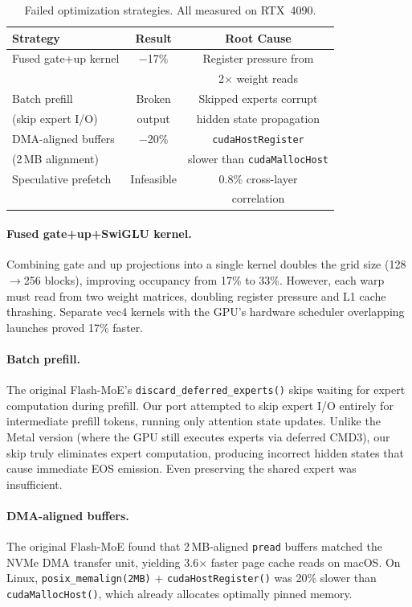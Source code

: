 \documentclass[11pt]{article}
\begin{document}
\begin{table}[h]
\centering
\small
\caption{Failed optimization strategies. All measured on RTX~4090.}
\label{tab:negative}
\begin{tabular}{lcc}
\toprule
\textbf{Strategy} & \textbf{Result} & \textbf{Root Cause} \\
\midrule
Fused gate+up kernel & $-$17\% & Register pressure from \\
& & 2$\times$ weight reads \\
Batch prefill & Broken & Skipped experts corrupt \\
(skip expert I/O) & output & hidden state propagation \\
DMA-aligned buffers & $-$20\% & \texttt{cudaHostRegister} \\
(2\,MB alignment) & & slower than \texttt{cudaMallocHost} \\
Speculative prefetch & Infeasible & 0.8\% cross-layer \\
& & correlation \\
\bottomrule
\end{tabular}
\end{table}

\paragraph{Fused gate+up+SwiGLU kernel.} Combining gate and up projections into a single kernel doubles the grid size (128$\to$256 blocks), improving occupancy from 17\% to 33\%. However, each warp must read from two weight matrices, doubling register pressure and L1 cache thrashing. Separate vec4 kernels with the GPU's hardware scheduler overlapping launches proved 17\% faster.

\paragraph{Batch prefill.} The original Flash-MoE's \texttt{discard\_deferred\_experts()} skips waiting for expert computation during prefill. Our port attempted to skip expert I/O entirely for intermediate prefill tokens, running only attention state updates. Unlike the Metal version (where the GPU still executes experts via deferred CMD3), our skip truly eliminates expert computation, producing incorrect hidden states that cause immediate EOS emission. Even preserving the shared expert was insufficient.

\paragraph{DMA-aligned buffers.} The original Flash-MoE found that 2\,MB-aligned \texttt{pread} buffers matched the NVMe DMA transfer unit, yielding 3.6$\times$ faster page cache reads on macOS. On Linux, \texttt{posix\_memalign(2MB)} + \texttt{cudaHostRegister()} was 20\% slower than \texttt{cudaMallocHost()}, which already allocates optimally pinned memory.
\end{document}
